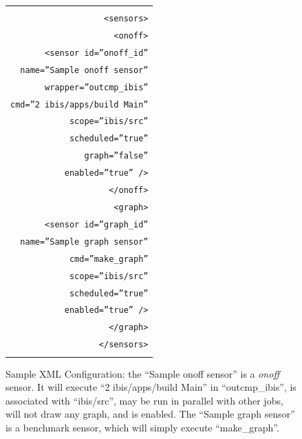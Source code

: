\documentclass[a4paper,10pt]{article}
\renewcommand{\|}{\url|}
\begin{document}
\begin{figure}[ht]
  \begin{center}
    \begin{tabular}{|r|} \hline
      \begin{minipage}{\textwidth}
	\begin{tabbing}
	  iii\=iii\=iiiiiiiiiiiiiiii\=iii\=\kill\\
	  \texttt{<sensors>}\\
	  \>\texttt{<onoff>}\\
	  \>\>\texttt{<sensor id=''onoff\_id''}\\
	    \>\>\>\texttt{name=''Sample onoff sensor''}\\
	      \>\>\>\texttt{wrapper=''outcmp\_ibis''}\\
		\>\>\>\texttt{cmd=''2 ibis/apps/build Main''}\\
		  \>\>\>\texttt{scope=''ibis/src''}\\
		    \>\>\>\texttt{scheduled=''true''}\\
		      \>\>\>\texttt{graph=''false''}\\
			\>\>\>\texttt{enabled=''true'' />}\\
	  \>\texttt{</onoff>}\\
	  \>\texttt{<graph>}\\
	  \>\>\texttt{<sensor id=''graph\_id''}\\
	    \>\>\>\texttt{name=''Sample graph sensor''}\\
		\>\>\>\texttt{cmd=''make\_graph''}\\
		  \>\>\>\texttt{scope=''ibis/src''}\\
		    \>\>\>\texttt{scheduled=''true''}\\
			\>\>\>\texttt{enabled=''true'' />}\\
	  \>\texttt{</graph>}\\
	  \texttt{</sensors>}\\
	\end{tabbing}
      \end{minipage}\\
      \hline
    \end{tabular}
  \end{center}
  \caption{Sample XML Configuration: the ``Sample onoff sensor'' is a \emph{onoff} sensor. It will execute ``2 ibis/apps/build Main'' in ``outcmp\_ibis'', is associated with ``ibis/src'', may be run in parallel with other jobs, will not draw any graph, and is enabled. The ``Sample graph sensor'' is a benchmark sensor, which will simply execute ``make\_graph''.}
  \label{fig:xml_config}
\end{figure}
\end{document}
